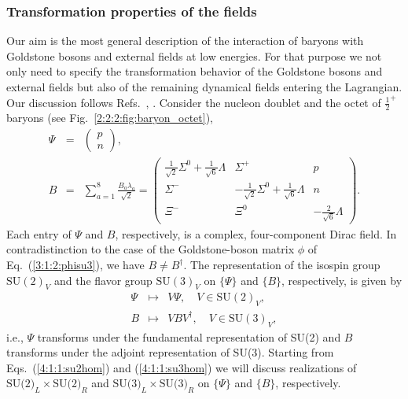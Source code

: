 \documentclass[twoside,12pt]{article}
\begin{document}
\subsubsection{Transformation properties of the fields}
\label{sec_tpf}
   Our aim is the most general description of the interaction of baryons with Goldstone
bosons and external fields at low energies.
   For that purpose we not only need to specify the transformation behavior of the Goldstone
bosons and external fields but also of the remaining dynamical fields entering the Lagrangian.
   Our discussion follows Refs.\ \cite{Georgi}, \cite{Gasser:1987rb}.
   Consider the nucleon doublet and the octet of $\frac{1}{2}^+$ baryons (see Fig.~\ref{2:2:2:fig:baryon_octet}),
\begin{eqnarray}
\label{4:1:1:nucleondoublet}
\Psi&=&\left(\begin{array}{c}p\\n\end{array}\right),\\
\label{4:1:1:su3oktett}
B&=&\sum_{a=1}^8 \frac{B_a\lambda_a}{\sqrt{2}}=
\left(\begin{array}{ccc}
\frac{1}{\sqrt{2}}\Sigma^0+\frac{1}{\sqrt{6}}\Lambda&\Sigma^+&p\\
\Sigma^-&-\frac{1}{\sqrt{2}}\Sigma^0+\frac{1}{\sqrt{6}}\Lambda&n\\
\Xi^-&\Xi^0&-\frac{2}{\sqrt{6}}\Lambda
\end{array}\right).
\end{eqnarray}
   Each entry of $\Psi$ and $B$, respectively, is a complex, four-component Dirac field.
   In contradistinction to the case of the Goldstone-boson matrix $\phi$ of Eq.~(\ref{3:1:2:phisu3}),
we have $B\neq B^\dagger$.
   The representation of the isospin group $\mbox{SU}(2)_V$ and the flavor group $\mbox{SU}(3)_V$ on
$\{\Psi\}$ and $\{B\}$, respectively, is given by
\begin{eqnarray}
\label{4:1:1:su2hom}
\Psi&\mapsto& V \Psi,\quad V\in \mbox{SU}(2)_V,\\
\label{4:1:1:su3hom}
B&\mapsto& V B V^\dagger,\quad V\in\mbox{SU}(3)_V,
\end{eqnarray}
i.e., $\Psi$ transforms under the fundamental representation of SU(2) and
$B$ transforms under the adjoint representation of SU(3).
   Starting from Eqs.~(\ref{4:1:1:su2hom}) and (\ref{4:1:1:su3hom}) we will discuss
realizations of $\mbox{SU(2)}_L\times\mbox{SU(2)}_R$ and  $\mbox{SU(3)}_L\times\mbox{SU(3)}_R$
on $\{\Psi\}$ and $\{B\}$, respectively.
\end{document}
